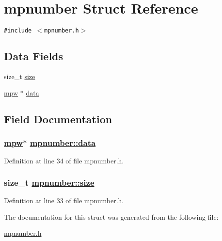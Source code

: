\hypertarget{structmpnumber}{
\section{mpnumber Struct Reference}
\label{structmpnumber}
}
{\tt \#include $<$mpnumber.h$>$}

\subsection*{Data Fields}
\begin{CompactItemize}
\item 
size\_\-t \hyperlink{structmpnumber_o0}{size}
\item 
\hyperlink{beecrypt_8api_8h_a9}{mpw} $\ast$ \hyperlink{structmpnumber_o1}{data}
\end{CompactItemize}


\subsection{Field Documentation}
\hypertarget{structmpnumber_o1}{
\subsubsection[data]{\setlength{\rightskip}{0pt plus 5cm}\hyperlink{beecrypt_8api_8h_a9}{mpw}$\ast$ \hyperlink{structmpnumber_o1}{mpnumber::data}}}
\label{structmpnumber_o1}


Definition at line 34 of file mpnumber.h.\hypertarget{structmpnumber_o0}{
\subsubsection[size]{\setlength{\rightskip}{0pt plus 5cm}size\_\-t \hyperlink{structmpnumber_o0}{mpnumber::size}}}
\label{structmpnumber_o0}


Definition at line 33 of file mpnumber.h.

The documentation for this struct was generated from the following file:\begin{CompactItemize}
\item 
\hyperlink{mpnumber_8h}{mpnumber.h}\end{CompactItemize}

